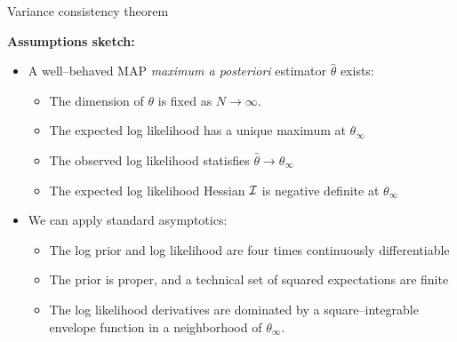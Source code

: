 \begin{frame}[t]{Variance consistency theorem}

    
\def\thetatrue{\theta_{\infty}}
\def\thetahat{\hat\theta}


\def\normdist{\mathcal{N}}

\def\gcovtrue{V^g}
\def\gcovij{V^{\mathrm{IJ}}}

\textbf{Assumptions sketch:}
%
\begin{itemize}
    \item A well--behaved MAP \textit{maximum a posteriori} estimator $\thetahat$ exists:
    \begin{itemize}
        \item The dimension of $\theta$ is fixed as $N \rightarrow \infty$.
        \item The expected log likelihood has a unique maximum at $\thetatrue$
        \item The observed log likelihood statisfies $\thetahat \rightarrow \thetatrue$
        \item The expected log likelihood Hessian $\mathcal{I}$ is negative definite at $\thetatrue$ 
    \end{itemize}
    \item We can apply standard asymptotics:
    \begin{itemize}
    \item The log prior and log likelihood are four times continuously differentiable
    \item The prior is proper, and a technical set of squared expectations are finite
    \item The log likelihood derivatives are dominated by a square--integrable envelope function in a
          neighborhood of $\theta_\infty$.
    \end{itemize}
\end{itemize}
%
\pause


\end{frame}
